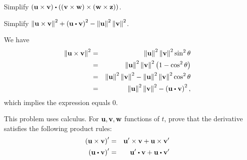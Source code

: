 \begin{enumialphparenastyle}
\begin{ex}
  Simplify
  $\tup{\vect{u}\times \vect{v}} \dotprod \tup{\tup{ \vect{v}\times
      \vect{w}} \times \tup{\vect{w}\times \vect{z}}}$.
\end{ex}

\begin{ex}
  Simplify
  $\norm{\vect{u}\times \vect{v}} ^{2}+\tup{ \vect{u}\dotprod
    \vect{v}} ^{2}-\norm{\vect{u}} ^{2}\norm{ \vect{v}} ^{2}$.
  \begin{sol}
    We have
    \begin{eqnarray*}
      \norm{\vect{u}\times \vect{v}} ^{2}
      &=&\norm{\vect{u}
          } ^{2}\norm{\vect{v}} ^{2}\sin ^{2}\theta \\
      &=&\norm{\vect{u}} ^{2}\norm{\vect{v}}
          ^{2}\tup{1-\cos ^{2}\theta } \\
      &=&\norm{\vect{u}} ^{2}\norm{\vect{v}}
          ^{2}-\norm{\vect{u}} ^{2}\norm{\vect{v}}
          ^{2}\cos ^{2}\theta \\
      &=&\norm{\vect{u}} ^{2}\norm{\vect{v}}
          ^{2}-\tup{\vect{u}\dotprod \vect{v}} ^{2},
    \end{eqnarray*}
    which implies the expression equals $0$.
  \end{sol}
\end{ex}

\begin{ex}
  This problem uses calculus. For $\mbox{\bf u},\mbox{\bf v},\mbox{\bf w}$
  functions of $t$, prove that the derivative satisfies the following
  product rules:
  \begin{eqnarray*}
    \tup{\vect{u}\times \vect{v}} ^{\prime }
    &=&\vect{u}^{\prime }\times
        \vect{v}+\vect{u}\times \vect{v}^{\prime } \\
    \tup{\vect{u}\dotprod \vect{v}} ^{\prime }
    &=&\vect{u}^{\prime }\dotprod
        \vect{v}+\vect{u}\dotprod \vect{v}^{\prime }
  \end{eqnarray*}
\end{ex}

\end{enumialphparenastyle}
